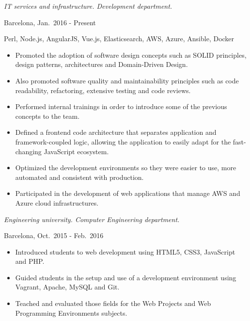 \begin{description}[itemsep=15pt]

    \item[Software Engineer, \href{http://capside.com}{CAPSiDE}] \hfill

        \emph{IT services and infrastructure. Development department.}

        Barcelona, Jan.\ 2016 - Present

        Perl, Node.js, AngularJS, Vue.js, Elasticsearch, AWS, Azure, Ansible, Docker

        \begin{itemize}[itemsep=0pt]
            \item Promoted the adoption of software design concepts such as SOLID principles, design patterns, architectures and Domain-Driven Design.
            \item Also promoted software quality and maintainability principles such as code readability, refactoring, extensive testing and code reviews.
            \item Performed internal trainings in order to introduce some of the previous concepts to the team.
            \item Defined a frontend code architecture that separates application and framework-coupled logic, allowing the application to easily adapt for the fast-changing JavaScript ecosystem.
            \item Optimized the development environments so they were easier to use, more automated and consistent with production.
            \item Participated in the development of web applications that manage AWS and Azure cloud infrastructures.
        \end{itemize}
\newpage

    \item[Adjunct Lecturer in Web Projects, \href{http://www.salleurl.edu}{La Salle Campus}] \hfill

        \emph{Engineering university. Computer Engineering department.}

        Barcelona, Oct.\ 2015 - Feb.\ 2016

        \begin{itemize}[itemsep=0pt]
            \item Introduced students to web development using HTML5, CSS3, JavaScript and PHP.
            \item Guided students in the setup and use of a development environment using Vagrant, Apache, MySQL and Git.
            \item Teached and evaluated those fields for the Web Projects and Web Programming Environments subjects.
        \end{itemize}


\end{description}
